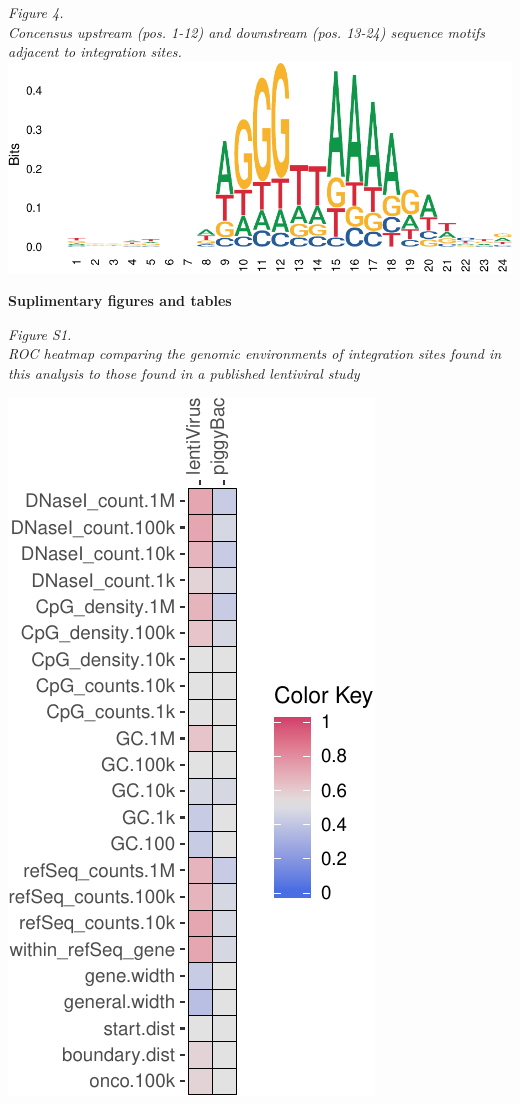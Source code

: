 \documentclass[12pt,]{article}
\begin{document}
\emph{Figure 4.}\\
\emph{Concensus upstream (pos. 1-12) and downstream (pos. 13-24)
sequence motifs adjacent to integration sites.}\\
\vspace{0.25cm}
\includegraphics{project_files/figure-latex/upStreamDownStreamLogo-1.pdf}
\newpage

\textbf{Suplimentary figures and tables}

\vspace{1.0cm} \emph{Figure S1.}\\
\emph{ROC heatmap comparing the genomic environments of integration
sites found in this analysis to those found in a published lentiviral
study}

\vspace{1.0cm}

\includegraphics{project_files/figure-latex/FS1-1.pdf}
\end{document}
